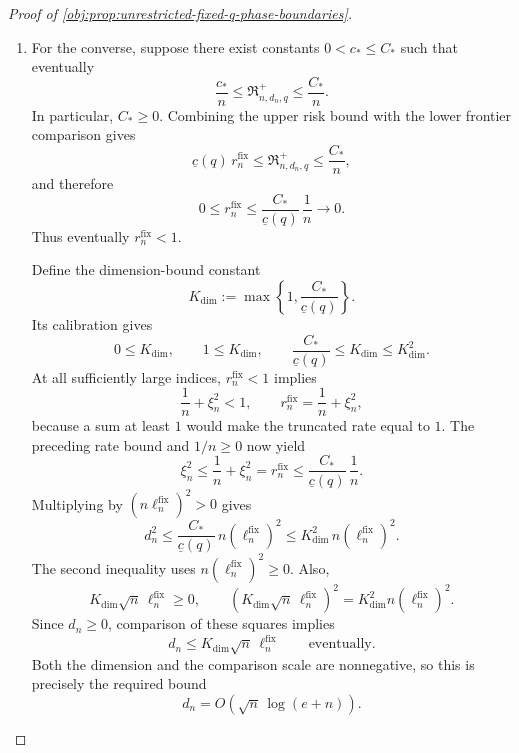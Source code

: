 \begin{proof}[Proof of \cref{obj:prop:unrestricted-fixed-q-phase-boundaries}]
\begin{enumerate}
\item For the converse, suppose there exist constants \(0<c_*\le C_*\) such that eventually
\[
\frac{c_*}{n}
\le\mathfrak R^{+}_{n,d_n,q}
\le\frac{C_*}{n}.
\]
In particular, \(C_*\ge0\). Combining the upper risk bound with the lower frontier comparison gives
\[
\underline c(q)\,r_n^{\mathrm{fix}}
\le\mathfrak R^{+}_{n,d_n,q}
\le\frac{C_*}{n},
\]
and therefore
\[
0\le r_n^{\mathrm{fix}}
\le\frac{C_*}{\underline c(q)}\,\frac1n
\longrightarrow0.
\]
Thus eventually \(r_n^{\mathrm{fix}}<1\).

Define the dimension-bound constant
\[
K_{\mathrm{dim}}
:=\max\left\{1,\frac{C_*}{\underline c(q)}\right\}.
\]
Its calibration gives
\[
0\le K_{\mathrm{dim}},
\qquad
1\le K_{\mathrm{dim}},
\qquad
\frac{C_*}{\underline c(q)}
\le K_{\mathrm{dim}}
\le K_{\mathrm{dim}}^2.
\]
At all sufficiently large indices, \(r_n^{\mathrm{fix}}<1\) implies
\[
\frac1n+\xi_n^2<1,
\qquad
r_n^{\mathrm{fix}}=\frac1n+\xi_n^2,
\]
because a sum at least \(1\) would make the truncated rate equal to \(1\).
The preceding rate bound and \(1/n\ge0\) now yield
\[
\xi_n^2
\le\frac1n+\xi_n^2
=r_n^{\mathrm{fix}}
\le\frac{C_*}{\underline c(q)}\,\frac1n.
\]
Multiplying by \((n\ell_n^{\mathrm{fix}})^2>0\) gives
\[
d_n^2
\le\frac{C_*}{\underline c(q)}
\,n\left(\ell_n^{\mathrm{fix}}\right)^2
\le K_{\mathrm{dim}}^2
\,n\left(\ell_n^{\mathrm{fix}}\right)^2.
\]
The second inequality uses
\(n(\ell_n^{\mathrm{fix}})^2\ge0\). Also,
\[
K_{\mathrm{dim}}\sqrt n\,\ell_n^{\mathrm{fix}}\ge0,
\qquad
\left(K_{\mathrm{dim}}\sqrt n\,\ell_n^{\mathrm{fix}}\right)^2
=K_{\mathrm{dim}}^2n\left(\ell_n^{\mathrm{fix}}\right)^2.
\]
Since \(d_n\ge0\), comparison of these squares implies
\[
d_n\le K_{\mathrm{dim}}\sqrt n\,\ell_n^{\mathrm{fix}}
\qquad\text{eventually}.
\]
Both the dimension and the comparison scale are nonnegative, so this is precisely the required bound
\[
d_n=O\!\left(\sqrt n\,\log(e+n)\right).
\]
\end{enumerate}
\end{proof}

